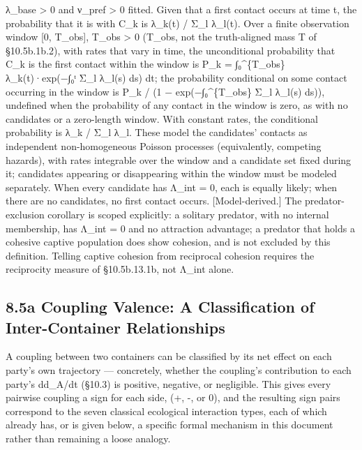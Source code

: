 \documentclass[
]{article}
\begin{document}
λ\_base \textgreater{} 0 and ν\_pref \textgreater{} 0 fitted. Given that
a first contact occurs at time t, the probability that it is with C\_k
is λ\_k(t) / Σ\_l λ\_l(t). Over a finite observation window {[}0,
T\_obs{]}, T\_obs \textgreater{} 0 (T\_obs, not the truth-aligned mass T
of §10.5b.1b.2), with rates that vary in time, the unconditional
probability that C\_k is the first contact within the window is P\_k =
∫₀\^{}\{T\_obs\} λ\_k(t)·exp(−∫₀ᵗ Σ\_l λ\_l(s) ds) dt; the probability
conditional on some contact occurring in the window is P\_k / (1 −
exp(−∫₀\^{}\{T\_obs\} Σ\_l λ\_l(s) ds)), undefined when the probability
of any contact in the window is zero, as with no candidates or a
zero-length window. With constant rates, the conditional probability is
λ\_k / Σ\_l λ\_l. These model the candidates' contacts as independent
non-homogeneous Poisson processes (equivalently, competing hazards),
with rates integrable over the window and a candidate set fixed during
it; candidates appearing or disappearing within the window must be
modeled separately. When every candidate has Λ\_int = 0, each is equally
likely; when there are no candidates, no first contact occurs.
{[}Model-derived.{]} The predator-exclusion corollary is scoped
explicitly: a solitary predator, with no internal membership, has Λ\_int
= 0 and no attraction advantage; a predator that holds a cohesive
captive population does show cohesion, and is not excluded by this
definition. Telling captive cohesion from reciprocal cohesion requires
the reciprocity measure of §10.5b.13.1b, not Λ\_int alone.

\hypertarget{a-coupling-valence-a-classification-of-inter-container-relationships}{%
\subsection{8.5a Coupling Valence: A Classification of Inter-Container
Relationships}\label{a-coupling-valence-a-classification-of-inter-container-relationships}}

A coupling between two containers can be classified by its net effect on
each party's own trajectory --- concretely, whether the coupling's
contribution to each party's dd\_A/dt (§10.3) is positive, negative, or
negligible. This gives every pairwise coupling a sign for each side, (+,
-, or 0), and the resulting sign pairs correspond to the seven classical
ecological interaction types, each of which already has, or is given
below, a specific formal mechanism in this document rather than
remaining a loose analogy.
\end{document}
